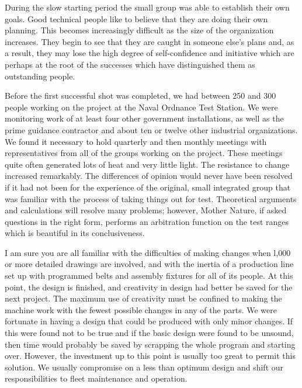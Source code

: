 \documentclass{memoir}
\begin{document}
During the slow starting period the small group was able to establish their own goals. Good technical people like to believe that they are doing their own planning. This becomes increasingly difficult as the size of the organization increases. They begin to see that they are caught in someone else's plans and, as a result, they may lose the high degree of self-confidence and initiative which are perhaps at the root of the successes which have distinguished them as outstanding people.

Before the first successful shot was completed, we had between 250 and 300 people working on the project at the Naval Ordnance Test Station. We were monitoring work of at least four other government installations, as well as the prime guidance contractor and about ten or twelve other industrial organizations. We found it necessary to hold quarterly and then monthly meetings with representatives from all of the groups working on the project. These meetings quite often generated lots of heat and very little light. The resistance to change increased remarkably. The differences of opinion would never have been resolved if it had not been for the experience of the original, small integrated group that was familiar with the process of taking things out for test. Theoretical arguments and calculations will resolve many problems; however, Mother Nature, if asked questions in the right form, performs an arbitration function on the test ranges which is beautiful in its conclusiveness.

I am sure you are all familiar with the difficulties of making changes when l,000 or more detailed drawings are involved, and with the inertia of a production line set up with programmed belts and assembly fixtures for all of its people. At this point, the design is finished, and creativity in design had better be saved for the next project. The maximum use of creativity must be confined to making the machine work with the fewest possible changes in any of the parts. We were fortunate in having a design that could be produced with only minor changes. If this were found not to be true and if the basic design were found to be unsound, then time would probably be saved by scrapping the whole program and starting over. However, the investment up to this point is usually too great to permit this solution. We usually compromise on a less than optimum design and shift our responsibilities to fleet maintenance and operation.
\end{document}
